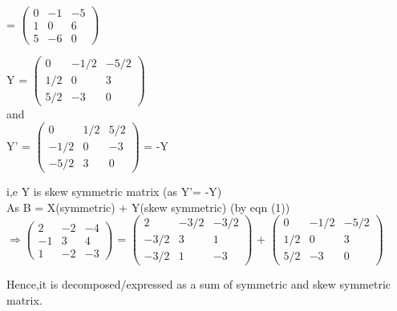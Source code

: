 \documentclass[a4paper,12pt]{article}
\begin{document}
\hspace*{1cm}

\hspace*{0.5cm}= $\begin{pmatrix}0 & -1 & -5 \\1 & 0 & 6 \\5 & -6 & 0\end{pmatrix}$\\

\hspace*{1cm}

Y = $\begin{pmatrix}0 & -1/2 & -5/2 \\1/2 & 0 & 3 \\5/2 & -3 & 0\end{pmatrix}$\\
 
and\\

Y' = $\begin{pmatrix}0 & 1/2 & 5/2 \\-1/2 & 0 & -3 \\-5/2 & 3 & 0\end{pmatrix}$ = -Y \\
\vspace*{1cm}

i,e Y is skew symmetric matrix \hspace*{3cm}(as Y'= -Y)\\
 
As B = X(symmetric) + Y(skew symmetric)  \hspace*{2cm} (by eqn (1))\\

$\Rightarrow \begin{pmatrix}2 & -2 & -4 \\-1 & 3 & 4 \\1 & -2 & -3\end{pmatrix}$ = $\begin{pmatrix}2 & -3/2 & -3/2 \\-3/2 & 3 & 1 \\-3/2 & 1 & -3\end{pmatrix}$ + $\begin{pmatrix}0 & -1/2 & -5/2 \\1/2 & 0 & 3 \\5/2 & -3 & 0\end{pmatrix}$\\

\vspace*{1cm}

Hence,it is decomposed/expressed as a sum of symmetric and skew symmetric matrix.

\pagebreak



 
\end{document}
